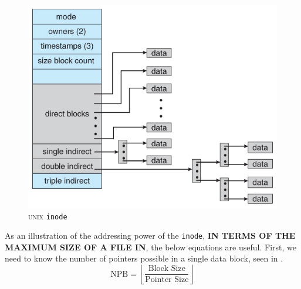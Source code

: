 \begin{figure}[h!tbp]
  \centering
  \includegraphics[scale=1.0]{./Drawings/EDAF35-Operating_Systems/UNIX_inode.jpg}
  \caption{\textsc{unix} \texttt{inode}}
  \label{fig:Inode}
\end{figure}

As an illustration of the addressing power of the \texttt{inode}, \textbf{IN TERMS OF THE MAXIMUM SIZE OF A FILE IN}, the below equations are useful.
First, we need to know the number of pointers possible in a single data block, seen in .
\begin{equation}\label{eq:Inode_Num_Pointers}
  \mathrm{NPB} = \left\lfloor \frac{\text{Block Size}}{\text{Pointer Size}} \right\rfloor
\end{equation}

